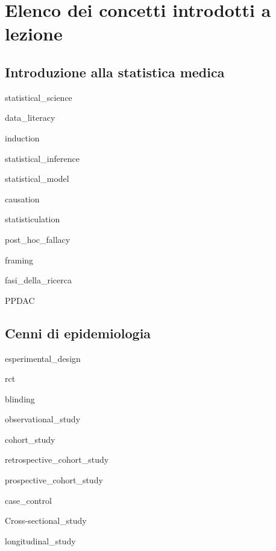 \documentclass{report}
\begin{document}
\fancyhf{}
\fancyfoot[C]{}
\pagestyle{fancy}

\printnoidxglossary[sort=letter, title={Glossario}]

\newpage



\section*{Elenco dei concetti introdotti a lezione}


\subsection*{Introduzione alla statistica medica}

\gls{statistical_science}

\noindent \gls{data_literacy}

\noindent \gls{induction}

\noindent \gls{statistical_inference}

\noindent \gls{statistical_model}

\noindent \gls{causation}

\noindent \gls{statisticulation}

\noindent \gls{post_hoc_fallacy}

\noindent \gls{framing}

\noindent \gls{fasi_della_ricerca}

\noindent \gls{PPDAC}



\subsection*{Cenni di epidemiologia}

\noindent \gls{esperimental_design}

\noindent \gls{rct}

\noindent \gls{blinding}

\noindent \gls{observational_study}

\noindent \gls{cohort_study}

\noindent \gls{retrospective_cohort_study}

\noindent \gls{prospective_cohort_study}

\noindent \gls{case_control}

\noindent \gls{Cross-sectional_study}

\noindent \gls{longitudinal_study}
\end{document}
